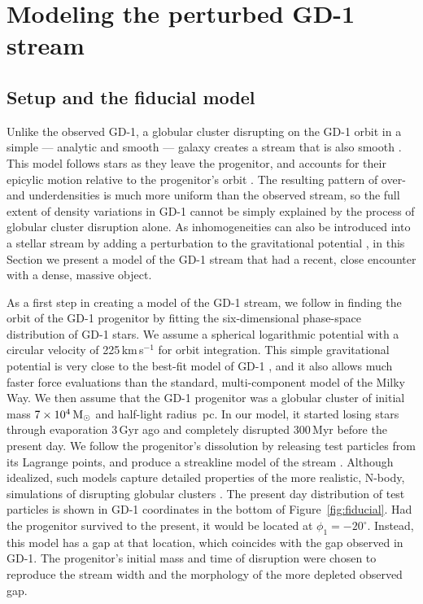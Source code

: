 \documentclass[twocolumn]{aastex62}
\begin{document}
\section{Modeling the perturbed GD-1 stream}
\subsection{Setup and the fiducial model}
\label{sec:model}
Unlike the observed GD-1, a globular cluster disrupting on the GD-1 orbit in a simple --- analytic and smooth --- galaxy creates a stream that is also smooth \citep{pwb}.
This model follows stars as they leave the progenitor, and accounts for their epicylic motion relative to the progenitor's orbit \citep{kupper2008, kupper2010, fardal2015}.
The resulting pattern of over- and underdensities is much more uniform than the observed stream, so the full extent of density variations in GD-1 cannot be simply explained by the process of globular cluster disruption alone.
As inhomogeneities can also be introduced into a stellar stream by adding a perturbation to the gravitational potential \citep[e.g.,][]{sgv2008}, in this Section we present a model of the GD-1 stream that had a recent, close encounter with a dense, massive object.

As a first step in creating a model of the GD-1 stream, we follow \citet{pwb} in finding the orbit of the GD-1 progenitor by fitting the six-dimensional phase-space distribution of GD-1 stars.
We assume a spherical logarithmic potential with a circular velocity of 225\,km\,s$^{-1}$ for orbit integration.
This simple gravitational potential is very close to the best-fit model of GD-1 \citep{koposov2010, bowden2015}, and it also allows much faster force evaluations than the standard, multi-component model of the Milky Way.
We then assume that the GD-1 progenitor was a globular cluster of initial mass $7\times10^4\rm\,M_\odot$ and half-light radius \,pc.
In our model, it started losing stars through evaporation 3\,Gyr ago and completely disrupted 300\,Myr before the present day.
We follow the progenitor's dissolution by releasing test particles from its Lagrange points, and produce a streakline model of the stream \citep{fardal2015}.
Although idealized, such models capture detailed properties of the more realistic, N-body, simulations of disrupting globular clusters \citep{kupper2012}.
The present day distribution of test particles is shown in GD-1 coordinates in the bottom of Figure~\ref{fig:fiducial}.
Had the progenitor survived to the present, it would be located at $\phi_1=-20^\circ$.
Instead, this model has a gap at that location, which coincides with the gap observed in GD-1.
The progenitor's initial mass and time of disruption were chosen to reproduce the stream width and the morphology of the more depleted observed gap.
\end{document}
